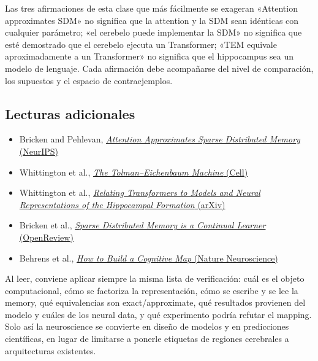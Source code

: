 \begin{warningbox}{Las tres afirmaciones de esta clase que más fácilmente se exageran}
«Attention approximates SDM» no significa que la attention y la SDM sean idénticas con cualquier parámetro; «el cerebelo puede implementar la SDM» no significa que esté demostrado que el cerebelo ejecuta un Transformer; «TEM equivale aproximadamente a un Transformer» no significa que el hippocampus sea un modelo de lenguaje. Cada afirmación debe acompañarse del nivel de comparación, los supuestos y el espacio de contraejemplos.
\end{warningbox}

\subsection{Lecturas adicionales}

\begin{itemize}
  \item Bricken and Pehlevan, \href{https://proceedings.neurips.cc/paper/2021/hash/8171ac2c5544a5cb54ac0f38bf477af4-Abstract.html}{\emph{Attention Approximates Sparse Distributed Memory} (NeurIPS)}
  \item Whittington et al., \href{https://www.sciencedirect.com/science/article/pii/S009286742031388X}{\emph{The Tolman--Eichenbaum Machine} (Cell)}
  \item Whittington et al., \href{https://arxiv.org/abs/2112.04035}{\emph{Relating Transformers to Models and Neural Representations of the Hippocampal Formation} (arXiv)}
  \item Bricken et al., \href{https://openreview.net/forum?id=JknGeelZJpHP}{\emph{Sparse Distributed Memory is a Continual Learner} (OpenReview)}
  \item Behrens et al., \href{https://www.nature.com/articles/s41593-022-01153-y}{\emph{How to Build a Cognitive Map} (Nature Neuroscience)}
\end{itemize}

Al leer, conviene aplicar siempre la misma lista de verificación: cuál es el objeto computacional, cómo se factoriza la representación, cómo se escribe y se lee la memory, qué equivalencias son exact/approximate, qué resultados provienen del modelo y cuáles de los neural data, y qué experimento podría refutar el mapping. Solo así la neuroscience se convierte en diseño de modelos y en predicciones científicas, en lugar de limitarse a ponerle etiquetas de regiones cerebrales a arquitecturas existentes.


